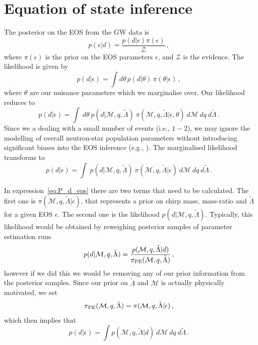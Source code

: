 \documentclass[twocolumn]{aastex631}
\begin{document}
\section{Equation of state inference}
\label{sec:EOS_inference}

The posterior on the EOS from the GW data is
%
\begin{equation}
  p(\epsilon| d) = \frac{p(d|{\epsilon})\pi(\epsilon)}{\mathcal{Z}}\,,
\end{equation}
%
where $\pi(\epsilon)$ is the prior on the EOS parameters $\epsilon$, and
$\mathcal{Z}$ is the evidence. The likelihood is given by
%
\begin{equation}
    p(d|\epsilon) = \int  d\theta \,p(d|\theta)\,\pi(\theta|\epsilon)\,,
\end{equation}
%
where $\theta$ are our nuisance parameters which we marginalise over.
Our likelihood reduces to
%
\begin{equation}
    p(d|\epsilon) = \int \ d\theta \ p(d|\mathcal{M},q,\tilde{\Lambda})
    \ \pi(\mathcal{M},q,\tilde{\Lambda}|\epsilon,\theta) \ d\mathcal{M}
    \ dq \ d \tilde{\Lambda}\,.
\end{equation}
%
Since we a dealing with a small number of events (i.e., $1-2$), we may
ignore the modelling of overall neutron-star population parameters
without introducing significant biases into the EOS inference (e.g.,
\citealt{2015Agathos, 2020Wysocki, 2020Landry}). The marginalised
likelihood transforms to
%
\begin{equation}
    p(d|\epsilon) = \int \ p(d|\mathcal{M},q,\tilde{\Lambda})
    \ \pi(\mathcal{M},q,\tilde{\Lambda}|\epsilon)\ d\mathcal{M} \ dq \ d
    \tilde{\Lambda}\,.
    \label{eq:P_d_eps}
\end{equation}

In expression~\eqref{eq:P_d_eps} there are two terms that need to be
calculated. The first one is $\pi(\mathcal{M}, q,
\tilde{\Lambda}|\epsilon)$, that represents a prior on chirp mass,
mass-ratio and $\tilde{\Lambda}$ for a given EOS $\epsilon$. The second
one is the likelihood $p(d|\mathcal{M},q,\tilde{\Lambda})$. Typically,
this likelihood would be obtained by reweighing posterior samples of
parameter estimation runs
%
\begin{equation}
    p(d|\mathcal{M},q,\tilde{\Lambda}) =
    \frac{p(\mathcal{M},q,\tilde{\Lambda}|d)}{\pi_{\rm
        PE}(\mathcal{M},q,\tilde{\Lambda})}\,,
\end{equation}
%
however if we did this we would be removing any of our prior information
from the posterior samples. Since our prior on $\tilde{\Lambda}$ and
$\mathcal{M}$ is actually physically motivated, we set
%
\begin{equation}
    \pi_{\rm PE}(\mathcal{M},q,\tilde{\Lambda}) =
    \pi(\mathcal{M},q,\tilde{\Lambda}|\epsilon)\,,
\end{equation}
%
which then implies that
%
\begin{equation}
    p(d|\epsilon) = \int p(\mathcal{M},q,\tilde{\Lambda}|d)\ d
    \mathcal{M} \ d q \ d \tilde{\Lambda}\,.
\end{equation}
\end{document}
